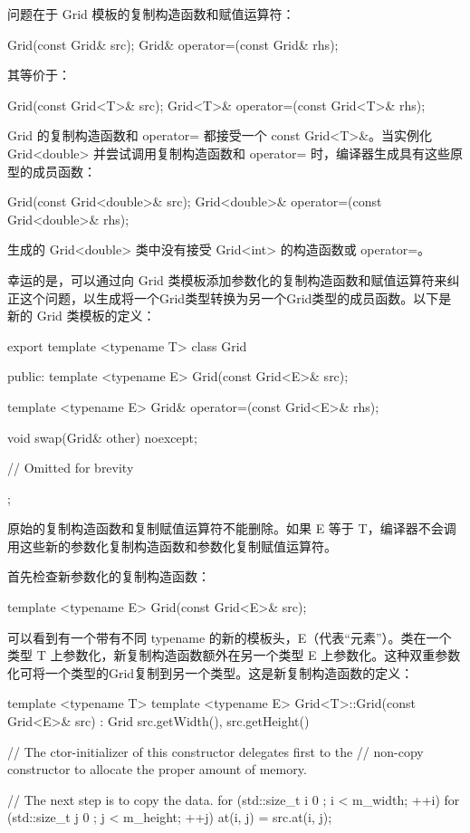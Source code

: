 问题在于 Grid 模板的复制构造函数和赋值运算符：

\begin{cpp}
Grid(const Grid& src);
Grid& operator=(const Grid& rhs);
\end{cpp}

其等价于：

\begin{cpp}
Grid(const Grid<T>& src);
Grid<T>& operator=(const Grid<T>& rhs);
\end{cpp}

Grid 的复制构造函数和 operator= 都接受一个 const Grid<T>\&。当实例化 Grid<double> 并尝试调用复制构造函数和 operator= 时，编译器生成具有这些原型的成员函数：

\begin{cpp}
Grid(const Grid<double>& src);
Grid<double>& operator=(const Grid<double>& rhs);
\end{cpp}

生成的 Grid<double> 类中没有接受 Grid<int> 的构造函数或 operator=。

幸运的是，可以通过向 Grid 类模板添加参数化的复制构造函数和赋值运算符来纠正这个问题，以生成将一个Grid类型转换为另一个Grid类型的成员函数。以下是新的 Grid 类模板的定义：

\begin{cpp}
export template <typename T>
class Grid
{
    public:
        template <typename E>
        Grid(const Grid<E>& src);

        template <typename E>
        Grid& operator=(const Grid<E>& rhs);

        void swap(Grid& other) noexcept;

        // Omitted for brevity
};
\end{cpp}

原始的复制构造函数和复制赋值运算符不能删除。如果 E 等于 T，编译器不会调用这些新的参数化复制构造函数和参数化复制赋值运算符。

首先检查新参数化的复制构造函数：

\begin{cpp}
template <typename E>
Grid(const Grid<E>& src);
\end{cpp}

可以看到有一个带有不同 typename 的新的模板头，E（代表“元素”）。类在一个类型 T 上参数化，新复制构造函数额外在另一个类型 E 上参数化。这种双重参数化可将一个类型的Grid复制到另一个类型。这是新复制构造函数的定义：

\begin{cpp}
template <typename T>
template <typename E>
Grid<T>::Grid(const Grid<E>& src)
    : Grid { src.getWidth(), src.getHeight() }
{
    // The ctor-initializer of this constructor delegates first to the
    // non-copy constructor to allocate the proper amount of memory.

    // The next step is to copy the data.
    for (std::size_t i { 0 }; i < m_width; ++i) {
        for (std::size_t j { 0 }; j < m_height; ++j) {
            at(i, j) = src.at(i, j);
        }
    }
}
\end{cpp}

